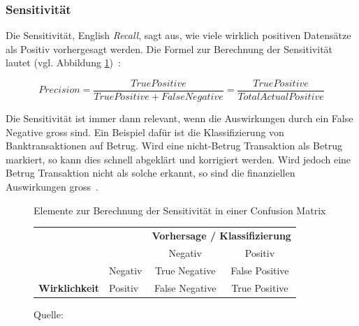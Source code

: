 \subsubsection{Sensitivität}

Die Sensitivität, English \textit{Recall}, sagt aus, wie viele wirklich positiven Datensätze als Positiv vorhergesagt werden. Die Formel zur Berechnung der Sensitivität lautet (vgl. Abbildung \ref{cm-recall})~\autocite{TDSAccuracy}: 

$$Precision = \frac{True Positive}{True Positive + False Negative} = \frac{True Positive}{Total Actual Positive}$$

Die Sensitivität ist immer dann relevant, wenn die Auswirkungen durch ein False Negative gross sind. Ein Beispiel dafür ist die Klassifizierung von Banktransaktionen auf Betrug. Wird eine nicht-Betrug Transaktion als Betrug markiert, so kann dies schnell abgeklärt und korrigiert werden. Wird jedoch eine Betrug Transaktion nicht als solche erkannt, so sind die finanziellen Auswirkungen gross~\autocite{TDSAccuracy}.

\begin{figure}[h!]
    \centering
    \captionsetup{width=.9\linewidth}
    \caption{Elemente zur Berechnung der Sensitivität in einer Confusion Matrix}
    \def\arraystretch{1.5}
    \begin{tabular}{llcc}
        \multicolumn{2}{l}{}                                                                                                & \multicolumn{2}{c}{\textbf{Vorhersage / Klassifizierung}}                                                                \\ \cline{3-4} 
        \multicolumn{1}{c}{\textbf{}}                                & \multicolumn{1}{l|}{}                                & \multicolumn{1}{c|}{Negativ}                                & \multicolumn{1}{c|}{Positiv}                               \\ \cline{2-4} 
        \multicolumn{1}{l|}{}                                        & \multicolumn{1}{l|}{Negativ}                         & \multicolumn{1}{c|}{True Negative}                          & \multicolumn{1}{c|}{False Positive}                        \\ \cline{2-4} 
        \multicolumn{1}{l|}{\multirow{-2}{*}{\textbf{Wirklichkeit}}} & \multicolumn{1}{l|}{\cellcolor[HTML]{B5D0EE}Positiv} & \multicolumn{1}{c|}{\cellcolor[HTML]{B5D0EE}False Negative} & \multicolumn{1}{c|}{\cellcolor[HTML]{B5D0EE}True Positive} \\ \cline{2-4} 
    \end{tabular}
    \caption*{Quelle: \textcite{TDSAccuracy}}
    \label{cm-recall}
\end{figure}

